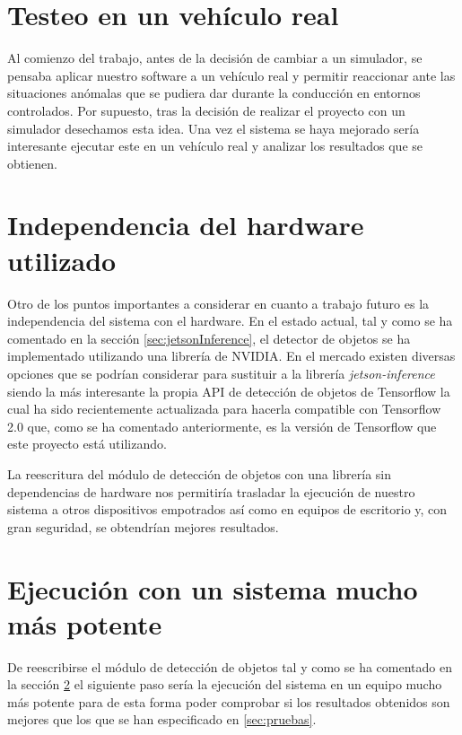 \section{Testeo en un vehículo real}
Al comienzo del trabajo, antes de la decisión de cambiar a un simulador, se pensaba aplicar nuestro software a un vehículo real y permitir reaccionar ante las situaciones anómalas que se pudiera dar durante la conducción en entornos controlados.
Por supuesto, tras la decisión de realizar el proyecto con un simulador desechamos esta idea.
Una vez el sistema se haya mejorado sería interesante ejecutar este en un vehículo real y analizar los resultados que se obtienen.

\section{Independencia del hardware utilizado} \label{sec:independenciaHardware}
Otro de los puntos importantes a considerar en cuanto a trabajo futuro es la independencia del sistema con el hardware.
En el estado actual, tal y como se ha comentado en la sección \ref{sec:jetsonInference}, el detector de objetos se ha implementado utilizando una librería de NVIDIA.
En el mercado existen diversas opciones que se podrían considerar para sustituir a la librería \textit{jetson-inference} siendo la más interesante la propia API de detección de objetos de Tensorflow la cual ha sido recientemente actualizada para hacerla compatible con Tensorflow 2.0 que, como se ha comentado anteriormente, es la versión de Tensorflow que este proyecto está utilizando.

La reescritura del módulo de detección de objetos con una librería sin dependencias de hardware nos permitiría trasladar la ejecución de nuestro sistema a otros dispositivos empotrados así como en equipos de escritorio y, con gran seguridad, se obtendrían mejores resultados.


\section{Ejecución con un sistema mucho más potente}
De reescribirse el módulo de detección de objetos tal y como se ha comentado en la sección \ref{sec:independenciaHardware} el siguiente paso sería la ejecución del sistema en un equipo mucho más potente para de esta forma poder comprobar si los resultados obtenidos son mejores que los que se han especificado en \ref{sec:pruebas}.
